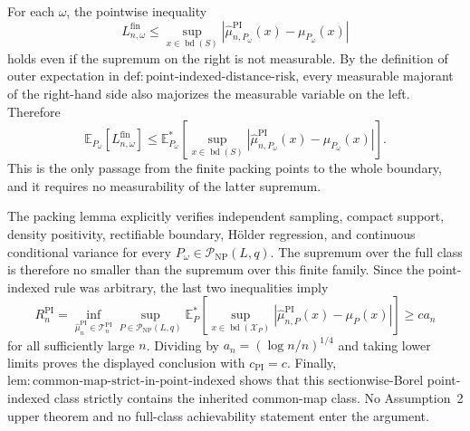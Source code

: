 For each \(\omega\), the pointwise inequality
\[
 L_{n,\omega}^{\mathrm{fin}}
 \leq
 \sup_{x\in\operatorname{bd}(S)}
 \left|
 \widehat\mu_{n,P_\omega}^{\mathrm{PI}}(x)
 -\mu_{P_\omega}(x)
 \right|
\]
holds even if the supremum on the right is not measurable.  By the definition of outer expectation in \(\mathrm{def:point\text{-}indexed\text{-}distance\text{-}risk}\), every measurable majorant of the right-hand side also majorizes the measurable variable on the left.  Therefore
\[
 \mathbb E_{P_\omega}
 \left[L_{n,\omega}^{\mathrm{fin}}\right]
 \leq
 \mathbb E_{P_\omega}^*\!\left[
 \sup_{x\in\operatorname{bd}(S)}
 \left|
 \widehat\mu_{n,P_\omega}^{\mathrm{PI}}(x)
 -\mu_{P_\omega}(x)
 \right|
 \right].
\]
This is the only passage from the finite packing points to the whole boundary, and it requires no measurability of the latter supremum.

The packing lemma explicitly verifies independent sampling, compact support, density positivity, rectifiable boundary, H\"older regression, and continuous conditional variance for every \(P_\omega\in\mathcal P_{\mathrm{NP}}(L,q)\).  The supremum over the full class is therefore no smaller than the supremum over this finite family.  Since the point-indexed rule was arbitrary, the last two inequalities imply
\[
 R_n^{\mathrm{PI}}
 =\inf_{\widehat\mu_n^{\mathrm{PI}}\in\mathcal T_n^{\mathrm{PI}}}
 \sup_{P\in\mathcal P_{\mathrm{NP}}(L,q)}
 \mathbb E_P^*\!\left[
 \sup_{x\in\operatorname{bd}(\mathcal X_P)}
 \left|
 \widehat\mu_{n,P}^{\mathrm{PI}}(x)-\mu_P(x)
 \right|
 \right]
 \geq c a_n
\]
for all sufficiently large \(n\).  Dividing by \(a_n=(\log n/n)^{1/4}\) and taking lower limits proves the displayed conclusion with \(c_{\mathrm{PI}}=c\).  Finally, \(\mathrm{lem:common\text{-}map\text{-}strict\text{-}in\text{-}point\text{-}indexed}\) shows that this sectionwise-Borel point-indexed class strictly contains the inherited common-map class.  No Assumption~2 upper theorem and no full-class achievability statement enter the argument.
